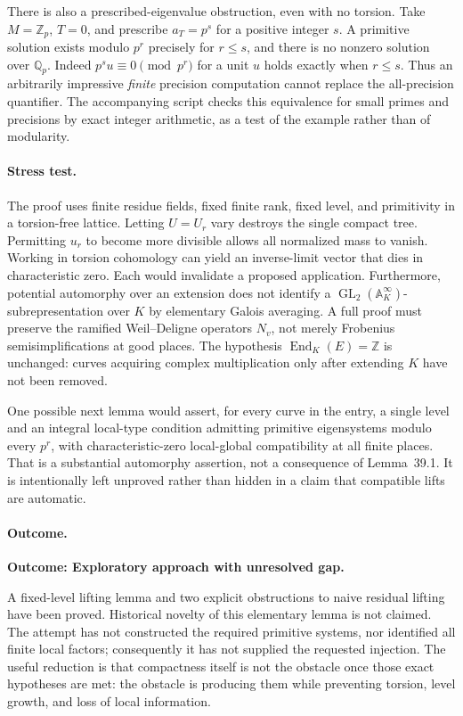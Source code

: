 \documentclass[11pt,a4paper]{article}
\newcommand{\Z}{\mathbb{Z}}
\newcommand{\Q}{\mathbb{Q}}
\newcommand{\A}{\mathbb{A}}
\numberwithin{equation}{section}
\begin{document}
There is also a prescribed-eigenvalue obstruction, even with no torsion. Take
$M=\Z_p$, $T=0$, and prescribe $a_T=p^s$ for a positive integer $s$. A primitive
solution exists modulo $p^r$ precisely for $r\le s$, and there is no nonzero
solution over $\Q_p$. Indeed $p^su\equiv0\pmod{p^r}$ for a unit $u$ holds
exactly when $r\le s$. Thus an arbitrarily impressive \emph{finite} precision
computation cannot replace the all-precision quantifier. The accompanying
script checks this equivalence for small primes and precisions by exact
integer arithmetic, as a test of the example rather than of modularity.

\paragraph{Stress test.}
The proof uses finite residue fields, fixed finite rank, fixed level, and
primitivity in a torsion-free lattice. Letting $U=U_r$ vary destroys the single
compact tree. Permitting $u_r$ to become more divisible allows all normalized
mass to vanish. Working in torsion cohomology can yield an inverse-limit vector
that dies in characteristic zero. Each would invalidate a proposed application.
Furthermore, potential automorphy over an extension does not identify a
$\operatorname{GL}_2(\A_K^\infty)$-subrepresentation over $K$ by elementary
Galois averaging. A full proof must preserve the ramified Weil--Deligne
operators $N_v$, not merely Frobenius semisimplifications at good places.
The hypothesis $\operatorname{End}_K(E)=\Z$ is unchanged: curves acquiring
complex multiplication only after extending $K$ have not been removed.

One possible next lemma would assert, for every curve in the entry, a single
level and an integral local-type condition admitting primitive eigensystems
modulo every $p^r$, with characteristic-zero local-global compatibility at all
finite places. That is a substantial automorphy assertion, not a consequence
of Lemma~39.1. It is intentionally left unproved rather than hidden in a claim
that compatible lifts are automatic.

\paragraph{Outcome.}
\textbf{Outcome: Exploratory approach with unresolved gap.}

A fixed-level lifting lemma and two explicit obstructions to naive residual
lifting have been proved. Historical novelty of this elementary lemma is not
claimed. The attempt has not constructed the required primitive systems, nor
identified all finite local factors; consequently it has not supplied the
requested injection. The useful reduction is that compactness itself is not
the obstacle once those exact hypotheses are met: the obstacle is producing
them while preventing torsion, level growth, and loss of local information.
\end{document}
